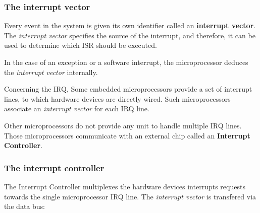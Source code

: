 \begin{frame}
  \frametitle{The interrupt vector}

  Every event in the system is given its own identifier called an
  {\bf interrupt vector}. The {\em interrupt vector} specifies the source of
  the interrupt, and therefore, it can be used to determine which ISR should
  be executed.

  \-

  In the case of an exception or a software interrupt, the microprocessor
  deduces the {\em interrupt vector} internally.

  \-

  Concerning the IRQ,
  Some embedded microprocessors provide a set of interrupt lines, to which
  hardware devices are directly wired. Such microprocessors associate an
  {\em interrupt vector} for each IRQ line.

  \-

  Other microprocessors do not provide any unit to handle multiple IRQ lines.
  Those microprocessors communicate with an external chip called an
  {\bf Interrupt Controller}.


\end{frame}

%
%
%

\begin{frame}
  \frametitle{The interrupt controller}

  The Interrupt Controller multiplexes the hardware devices interrupts requests
  towards the single microprocessor IRQ line. The {\em interrupt vector} is
  transfered via the data bus:

  \-

  \begin{center}
  \end{center}

\end{frame}

%
%
%

